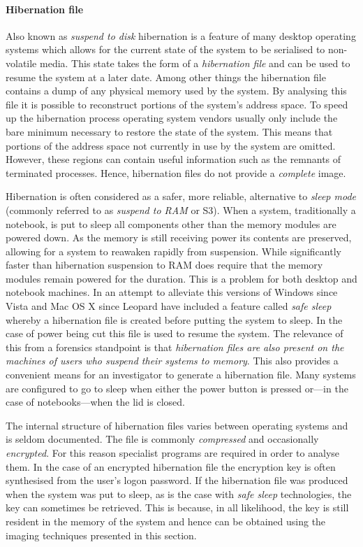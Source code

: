 \documentclass[numbers=noenddot,      %
               abstract,              %
               captions=tableheading, %
               DIV=8]                 %
              {scrartcl}
\begin{document}
\paragraph{Hibernation file}
Also known as \emph{suspend to disk} hibernation is a feature of many
desktop operating systems which allows for the current state of the
system to be serialised to non-volatile media. This state takes the form
of a \emph{hibernation file} and can be used to resume the system at a
later date. Among other things the hibernation file contains a dump of
any physical memory used by the system. By analysing this file it is
possible to reconstruct portions of the system's address space. To speed
up the hibernation process operating system vendors usually only include
the bare minimum necessary to restore the state of the system. This
means that portions of the address space not currently in use by the
system are omitted. However, these regions can contain useful
information such as the remnants of terminated processes. Hence,
hibernation files do not provide a \emph{complete} image.

Hibernation is often considered as a safer, more reliable, alternative
to \emph{sleep mode} (commonly referred to as \emph{suspend to RAM} or
S3). When a system, traditionally a notebook, is put to sleep all
components other than the memory modules are powered down. As the memory
is still receiving power its contents are preserved, allowing for a
system to reawaken rapidly from suspension. While significantly faster
than hibernation suspension to RAM does require that the memory modules
remain powered for the duration. This is a problem for both desktop and
notebook machines. In an attempt to alleviate this versions of Windows
since Vista and Mac OS X since Leopard have included a feature called
\emph{safe sleep} whereby a hibernation file is created before putting
the system to sleep. In the case of power being cut this file is used to
resume the system. The relevance of this from a forensics standpoint is
that \emph{hibernation files are also present on the machines of users
  who suspend their systems to memory}. This also provides a convenient
means for an investigator to generate a hibernation file. Many systems
are configured to go to sleep when either the power button is pressed
or---in the case of notebooks---when the lid is closed. 

The internal structure of hibernation files varies between operating
systems and is seldom documented. The file is commonly \emph{compressed}
and occasionally \emph{encrypted}. For this reason specialist programs
are required in order to analyse them. In the case of an encrypted
hibernation file the encryption key is often synthesised from the user's
logon password. If the hibernation file was produced when the system was
put to sleep, as is the case with \emph{safe sleep} technologies, the
key can sometimes be retrieved. This is because, in all likelihood,
the key is still resident in the memory of the system and hence can be
obtained using the imaging techniques presented in this section.
\end{document}
